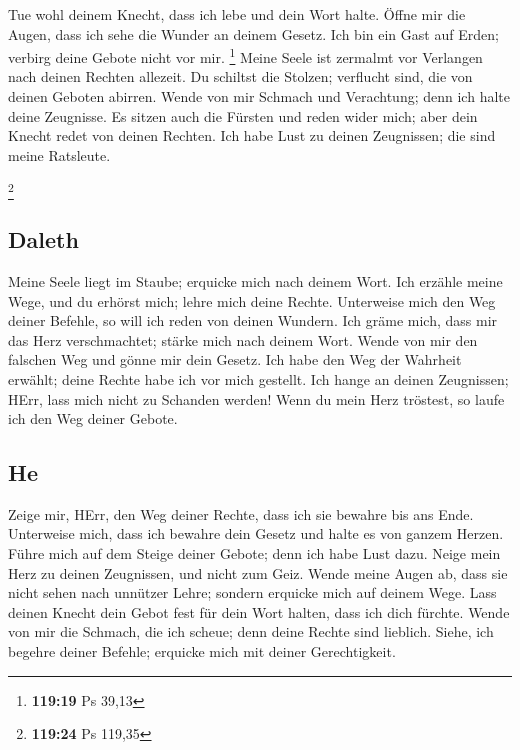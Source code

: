  Tue wohl deinem Knecht, dass ich lebe und dein Wort
halte.  Öffne mir die Augen, dass ich sehe die Wunder an
deinem Gesetz.  Ich bin ein Gast auf Erden; verbirg deine
Gebote nicht vor mir. \footnote{\textbf{119:19} Ps 39,13}
 Meine Seele ist zermalmt vor Verlangen nach deinen
Rechten allezeit.  Du schiltst die Stolzen; verflucht
sind, die von deinen Geboten abirren.  Wende von mir
Schmach und Verachtung; denn ich halte deine Zeugnisse. 
Es sitzen auch die Fürsten und reden wider mich; aber dein Knecht redet
von deinen Rechten.  Ich habe Lust zu deinen Zeugnissen;
die sind meine Ratsleute.

\footnote{\textbf{119:24} Ps 119,35}

\hypertarget{daleth}{%
\subsection{Daleth}\label{daleth}}

 Meine Seele liegt im Staube; erquicke mich nach deinem
Wort.  Ich erzähle meine Wege, und du erhörst mich; lehre
mich deine Rechte.  Unterweise mich den Weg deiner
Befehle, so will ich reden von deinen Wundern.  Ich gräme
mich, dass mir das Herz verschmachtet; stärke mich nach deinem Wort.
 Wende von mir den falschen Weg und gönne mir dein
Gesetz.  Ich habe den Weg der Wahrheit erwählt; deine
Rechte habe ich vor mich gestellt.  Ich hange an deinen
Zeugnissen; HErr, lass mich nicht zu Schanden werden! 
Wenn du mein Herz tröstest, so laufe ich den Weg deiner Gebote.

\hypertarget{he}{%
\subsection{He}\label{he}}

 Zeige mir, HErr, den Weg deiner Rechte, dass ich sie
bewahre bis ans Ende.  Unterweise mich, dass ich bewahre
dein Gesetz und halte es von ganzem Herzen.  Führe mich
auf dem Steige deiner Gebote; denn ich habe Lust dazu. 
Neige mein Herz zu deinen Zeugnissen, und nicht zum Geiz.
 Wende meine Augen ab, dass sie nicht sehen nach unnützer
Lehre; sondern erquicke mich auf deinem Wege.  Lass
deinen Knecht dein Gebot fest für dein Wort halten, dass ich dich
fürchte.  Wende von mir die Schmach, die ich scheue; denn
deine Rechte sind lieblich.  Siehe, ich begehre deiner
Befehle; erquicke mich mit deiner Gerechtigkeit.

